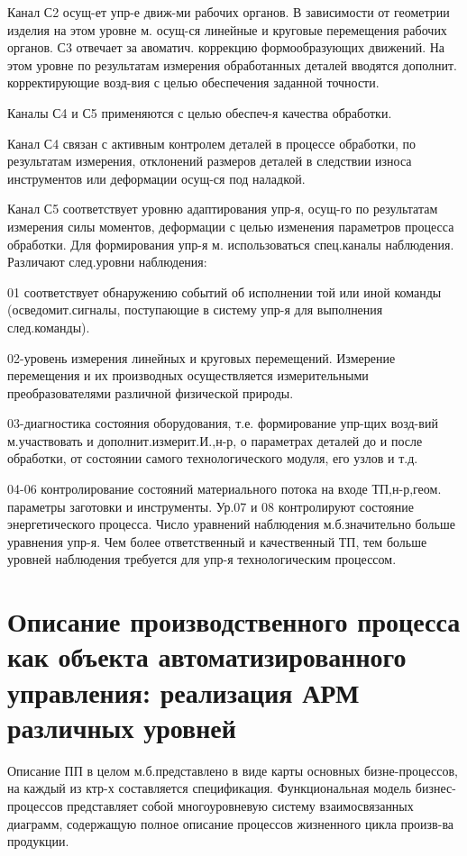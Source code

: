\documentclass[unicode, 12pt, a4paper, oneside]{article}
\begin{document}
Канал С2 осущ-ет упр-е движ-ми рабочих органов. В зависимости от геометрии изделия на этом уровне м. осущ-ся линейные и круговые перемещения рабочих органов.
С3 отвечает за авоматич. коррекцию формообразующих движений. На этом уровне по результатам измерения обработанных деталей вводятся дополнит. корректирующие возд-вия с целью обеспечения заданной точности.

Каналы С4 и С5 применяются с целью обеспеч-я качества обработки.

Канал С4 связан с активным контролем деталей в процессе обработки, по результатам измерения, отклонений размеров деталей в следствии износа инструментов или деформации осущ-ся под наладкой.

Канал С5 соответствует уровню адаптирования упр-я, осущ-го по результатам измерения силы моментов, деформации с целью изменения параметров процесса обработки.
Для формирования упр-я м. использоваться спец.каналы наблюдения. Различают след.уровни наблюдения:

01 соответствует обнаружению событий об исполнении той или иной команды (осведомит.сигналы, поступающие в систему упр-я для выполнения след.команды).

02-уровень измерения линейных и круговых перемещений. Измерение перемещения и их производных осуществляется измерительными преобразователями различной физической природы.

03-диагностика состояния оборудования, т.е. формирование упр-щих возд-вий м.участвовать и дополнит.измерит.И.,н-р, о параметрах деталей до и после обработки, от состоянии самого технологического модуля, его узлов и т.д.

04-06 контролирование состояний материального потока на входе ТП,н-р,геом. параметры заготовки и инструменты.
Ур.07 и 08 контролируют состояние энергетического процесса. Число уравнений наблюдения м.б.значительно больше уравнения упр-я. Чем более ответственный и качественный ТП, тем больше уровней наблюдения требуется для упр-я технологическим процессом.

\section{Описание производственного процесса как объекта автоматизированного управления: реализация АРМ различных уровней}

Описание ПП в целом м.б.представлено в виде карты основных бизне-процессов, на каждый из ктр-х составляется спецификация. Функциональная модель бизнес-процессов представляет собой многоуровневую систему взаимосвязанных диаграмм, содержащую полное описание процессов жизненного цикла произв-ва продукции.
\end{document}
